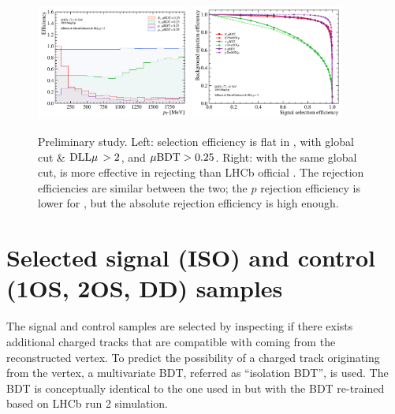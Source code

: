 \begin{figure}[htb]
    \centering
    \includegraphics[width=0.45\textwidth]{./figs-selection/eff_Brunel_PT_up_pidcalib_ubdt_eff.pdf}
    \hspace{1em}
    \includegraphics[width=0.45\textwidth]{./figs-selection/rej_v_eff_unbiased_Brunel_PT.pdf}

    \caption{
        Preliminary \UBDT study.
        Left: \UBDT \muon selection efficiency is flat in \pt, with
        global cut \isMuon \& $\text{\PID{\muon}}\! > 2$,
        and $\mu\text{BDT} > 0.25$.
        Right: with the same global cut, \UBDT is more effective in rejecting
        \pion than LHCb official \ProbNN{\muon}.
        The \kaon rejection efficiencies are similar between the two;
        the $p$ rejection efficiency is lower for \UBDT, but the absolute
        rejection efficiency is high enough.
    }
    \label{fig:ubdt-eff}
\end{figure}


\section{Selected signal (ISO) and control (1OS, 2OS, DD) samples}
\label{ref:selection:skims}

The signal and control samples are selected by inspecting if there exists
additional charged tracks that are compatible with coming from the
reconstructed \B vertex.
To predict the possibility of a charged track originating from the \B vertex,
a multivariate BDT, referred as ``isolation BDT'', is used.
The BDT is conceptually identical to the one used in
\cite{LHCb-ANA-2020-056} but with the BDT re-trained based on LHCb run 2
simulation.


